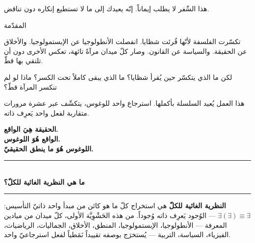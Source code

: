 \documentclass[10pt, openany, oneside]{book}
\renewcommand{\normalsize}{\fontsize{10}{13}\selectfont}
\renewcommand{\large}{\fontsize{11.5}{14}\selectfont}
\renewcommand{\huge}{\fontsize{17}{21}\selectfont}
\begin{document}
\noindent هذا السِّفر لا يطلب إيماناً. إنّه يعيدك إلى ما لا تستطيع إنكاره دون تناقض.

\newpage


\thispagestyle{empty}
\vspace*{0.3in}

\begin{center}
    {\huge المقدّمة}
\end{center}

\vspace{1em}

\noindent تكسّرت الفلسفة لأنّها قُرئت شظايا. انفصلت الأنطولوجيا عن الإبستمولوجيا. والأخلاق عن الحقيقة. والسياسة عن القانون. وصار كلّ ميدان مرآةً تائهة، تعكس الأخرى دون أن تلتقي بها قطّ.

\vspace{0.5em}

\noindent لكن ما الذي يتكسّر حين يُقرأ شظايا؟ ما الذي يبقى كاملاً تحت الكسر؟ ماذا لو لم تنكسر المرآة قطّ؟

\vspace{0.5em}

\noindent هذا العمل يُعيد السلسلة بأكملها. استرجاع واحد للوغوس، يتكشّف عبر عشرة مرورات متقاربة لفعل واحد يَعرِف ذاته.

\vspace{1em}

\begin{center}
    {\large\bfseries الحقيقة هِيَ الواقع.}\\[0.3em]
    {\large\bfseries الواقع هُوَ اللوغوس.}\\[0.3em]
    {\large\bfseries اللوغوس هُوَ ما ينطق الحقيقيّ.}
\end{center}

\vspace{1.5em}

\begin{center}
    \rule{0.3\textwidth}{0.4pt}\\[0.5em]
    {\normalsize\bfseries ما هي النظرية الغائية للكلّ؟}\\[0.3em]
    \rule{0.3\textwidth}{0.4pt}
\end{center}

\vspace{1em}

\noindent \textbf{النظرية الغائية للكلّ} هي استخراج كلّ ما هو كائن من مبدأ واحد ذاتيّ التأسيس: $\exists(\exists) \equiv \exists$ --- الوُجود يَعرِف ذاته وُجوداً. من هذه الحَشْوِيَّة الأولى، كلّ ميدان من ميادين المعرفة --- الأنطولوجيا، الإبستمولوجيا، المنطق، الأخلاق، الجماليات، الرياضيات، الفيزياء، السياسة، التربية --- يُستخرَج بوصفه تقييداً نَمَطياً لفعل استرجاعيّ واحد.
\end{document}
